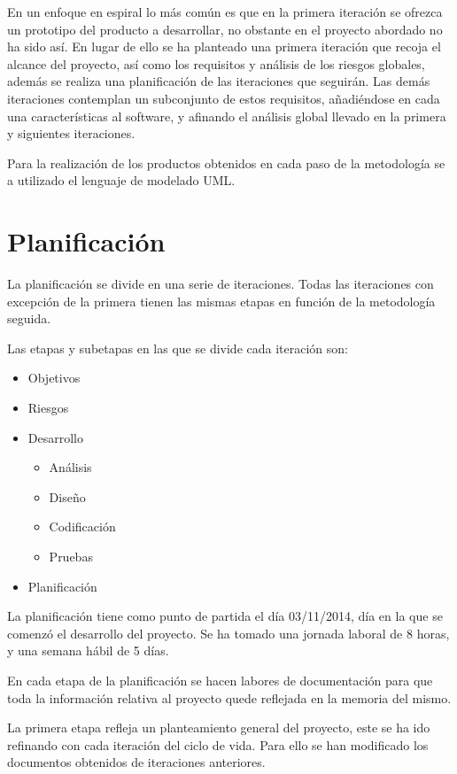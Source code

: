 En un enfoque en espiral lo más común es que en la primera iteración se ofrezca un prototipo del producto a desarrollar, 
no obstante en el proyecto abordado no ha sido así. En lugar de ello se ha planteado una primera iteración que recoja el alcance 
del proyecto, así como los requisitos y análisis de los riesgos globales, además se realiza una planificación de las iteraciones que seguirán. 
Las demás iteraciones contemplan un subconjunto de estos requisitos, añadiéndose en cada una características al software, y afinando el 
análisis global llevado en la primera y siguientes iteraciones.

Para la realización de los productos obtenidos en cada paso de la metodología se a utilizado el lenguaje de modelado UML. 
\section{Planificación}

La planificación se divide en una serie de iteraciones. Todas las 
iteraciones con excepción de la primera tienen las mismas etapas
en función de la metodología seguida.

Las etapas y subetapas en las que se divide cada iteración son:

\begin {itemize}
\item Objetivos
\item Riesgos
\item Desarrollo
\begin{itemize}
\item Análisis
\item Diseño
\item Codificación
\item Pruebas
\end{itemize}
\item Planificación
\end {itemize}

La planificación tiene como punto de partida el día 03/11/2014, día en la que se 
comenzó el desarrollo del proyecto. Se ha tomado una jornada laboral de 8 horas, 
y una semana hábil de 5 días.

En cada etapa de la planificación se hacen labores de documentación para que
toda la información relativa al proyecto quede reflejada en la memoria 
del mismo. 

La primera etapa refleja un planteamiento general del proyecto, este se ha ido refinando 
con cada iteración del ciclo de vida. Para ello se han modificado los documentos obtenidos de 
iteraciones anteriores.

